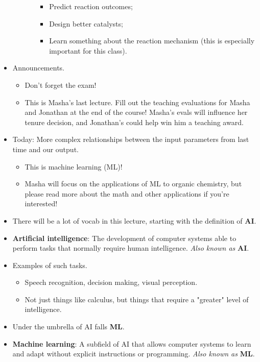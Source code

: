 \documentclass[../notes.tex]{subfiles}
\begin{document}
\begin{itemize}
\begin{itemize}
\begin{itemize}
            \begin{itemize}
                \item Predict reaction outcomes;
                \item Design better catalysts;
                \item Learn something about the reaction mechanism (this is especially important for this class).
            \end{itemize}
        \end{itemize}
    \end{itemize}
    \item Announcements.
    \begin{itemize}
        \item Don't forget the exam!
        \item This is Masha's last lecture. Fill out the teaching evaluations for Masha and Jonathan at the end of the course! Masha's evals will influence her tenure decision, and Jonathan's could help win him a teaching award.
    \end{itemize}
    \item Today: More complex relationships between the input parameters from last time and our output.
    \begin{itemize}
        \item This is machine learning (ML)!
        \item Masha will focus on the applications of ML to organic chemistry, but please read more about the math and other applications if you're interested!
    \end{itemize}
    \item There will be a lot of vocab in this lecture, starting with the definition of \textbf{AI}.
    \item \textbf{Artificial intelligence}: The development of computer systems able to perform tasks that normally require human intelligence. \emph{Also known as} \textbf{AI}.
    \item Examples of such tasks.
    \begin{itemize}
        \item Speech recognition, decision making, visual perception.
        \item Not just things like calculus, but things that require a "greater" level of intelligence.
    \end{itemize}
    \item Under the umbrella of AI falls \textbf{ML}.
    \item \textbf{Machine learning}: A subfield of AI that allows computer systems to learn and adapt without explicit instructions or programming. \emph{Also known as} \textbf{ML}.

\end{itemize}
\end{document}
